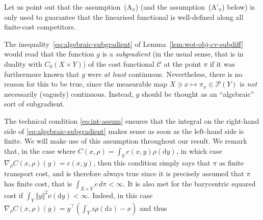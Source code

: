 \documentclass[leqno, 11pt, a4paper]{amsart}
\theoremstyle{definition}
\newcommand{\C}{\mathscr{C}}
\newcommand{\cP}{\mathcal{P}}
\newcommand{\dd}{\mathrm{d}}
\begin{document}
Let us point out that the assumption~(A$_\pi$) (and the assumption~(A'$_\pi$) below) is only used to guarantee that the linearised functional is well-defined along all finite-cost competitors.

The inequality~\eqref{eq:algebraic-subgradient} of Lemma~\ref{lem:wot-obj-cv-subdiff} would read that the function $g$ is a \textit{subgradient} (in the usual sense, that is in duality with $C_0(X \times Y)$) of the cost functional $\C$ at the point $\pi$ if it was furthermore known that $g$ were \textit{at least} continuous. Nevertheless, there is no reason for this to be true, since the measurable map $X \ni x \mapsto \pi_x \in \cP(Y)$ is \textit{not} necessarily (vaguely) continuous. Instead, $g$ should be thought as an ``algebraic'' sort of subgradient. 

The technical condition \eqref{eq:int-assum} ensures that the integral on the right-hand side of \eqref{eq:algebraic-subgradient} makes sense as soon as the left-hand side is finite.  We will make use of this assumption throughout our result. We remark that, in the case where $C(x, \rho) = \int_{Y} c(x, y)\rho(\dd y)$, in which case $\nabla_\rho C(x, \rho)(y) = c(x, y)$, then this condition simply says that $\pi$ as finite transport cost, and is therefore always true since it is precisely assumed that $\pi$ has finite cost, that is $\int_{X \times Y} c \, d \pi < \infty$. It is also met for the barycentric squared cost if $\int_{Y} \Vert y \Vert^2 \nu(\dd y)< \infty$. Indeed, in this case $\nabla_\rho C(x, \rho)(y) = y^\intercal (\int_{Y} z \rho(\dd z) - x)$ and thus 
\end{document}
